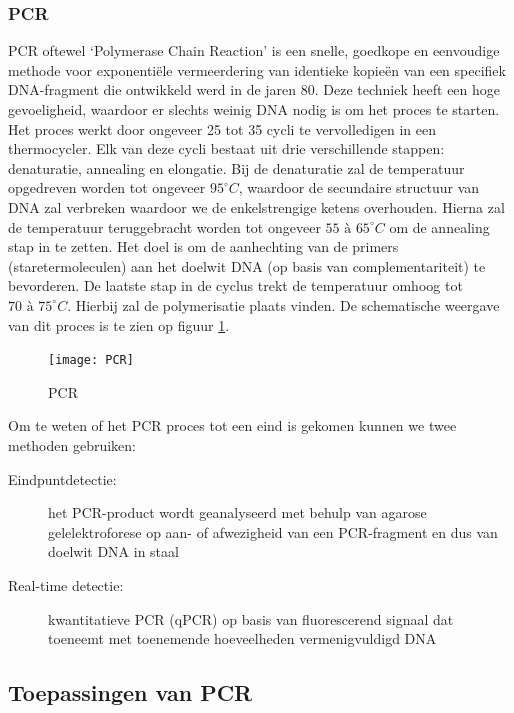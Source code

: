 \documentclass[a4paper,kul]{kulakarticle} %
\begin{document}
\subsubsection{PCR}
PCR oftewel `Polymerase Chain Reaction' is een snelle, goedkope en eenvoudige methode voor exponentiële vermeerdering van identieke kopieën van een specifiek DNA-fragment die ontwikkeld werd in de jaren 80. Deze techniek heeft een hoge gevoeligheid, waardoor er slechts weinig DNA nodig is om het proces te starten. 
\\
Het proces werkt door ongeveer 25 tot 35 cycli te vervolledigen in een thermocycler. Elk van deze cycli bestaat uit drie verschillende stappen: denaturatie, annealing en elongatie. Bij de denaturatie zal de temperatuur opgedreven worden tot ongeveer $95^\circ C$, waardoor de secundaire structuur van DNA zal verbreken waardoor we de enkelstrengige ketens overhouden. Hierna zal de temperatuur teruggebracht worden tot ongeveer $55 \text{ à } 65^\circ C$ om de annealing stap in te zetten. Het doel is om de aanhechting van de primers (staretermoleculen) aan het doelwit DNA (op basis van complementariteit) te bevorderen. De laatste stap in de cyclus trekt de temperatuur omhoog tot $70 \text{ à } 75^\circ C$. Hierbij zal de polymerisatie plaats vinden. De schematische weergave van dit proces is te zien op figuur \ref{fig:pcr}.
\newpage
\begin{figure}[h]
	\centering
	\texttt{[image: PCR]}
	\caption[PCR]{PCR}
	\label{fig:pcr}
\end{figure}
\noindent
Om te weten of het PCR proces tot een eind is gekomen kunnen we twee methoden gebruiken:
\begin{description}
	\item[Eindpuntdetectie:] het PCR-product wordt geanalyseerd met behulp van agarose gelelektroforese op aan- of afwezigheid van een PCR-fragment en dus van doelwit DNA in staal
	\item[Real-time detectie:] kwantitatieve PCR (qPCR) op basis van	fluorescerend signaal dat toeneemt met toenemende hoeveelheden vermenigvuldigd DNA
\end{description}
\subsection{Toepassingen van PCR}
\end{document}
